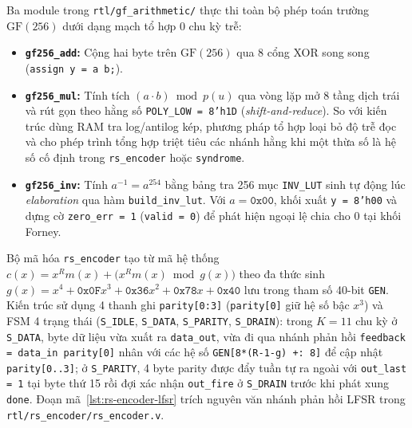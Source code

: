 \documentclass[11pt,a4paper]{report}
\begin{document}
Ba module trong \texttt{rtl/gf\_arithmetic/} thực thi toàn bộ phép toán trường $\text{GF}(256)$ dưới dạng mạch tổ hợp 0 chu kỳ trễ:
\begin{itemize}
    \item \textbf{\texttt{gf256\_add}:} Cộng hai byte trên $\text{GF}(256)$ qua 8 cổng XOR song song (\texttt{assign y = a  b;}).
    \item \textbf{\texttt{gf256\_mul}:} Tính tích $(a \cdot b) \bmod p(u)$ qua vòng lặp mở 8 tầng dịch trái và rút gọn theo hằng số \texttt{POLY\_LOW = 8'h1D} (\textit{shift-and-reduce}). So với kiến trúc dùng RAM tra log/antilog kép, phương pháp tổ hợp loại bỏ độ trễ đọc và cho phép trình tổng hợp triệt tiêu các nhánh hằng khi một thừa số là hệ số cố định trong \texttt{rs\_encoder} hoặc \texttt{syndrome}.
    \item \textbf{\texttt{gf256\_inv}:} Tính $a^{-1} = a^{254}$ bằng bảng tra 256 mục \texttt{INV\_LUT} sinh tự động lúc \textit{elaboration} qua hàm \texttt{build\_inv\_lut}. Với $a = \texttt{0x00}$, khối xuất \texttt{y = 8'h00} và dựng cờ \texttt{zero\_err = 1} (\texttt{valid = 0}) để phát hiện ngoại lệ chia cho 0 tại khối Forney.
\end{itemize}

Bộ mã hóa \texttt{rs\_encoder} tạo từ mã hệ thống $c(x) = x^R m(x) + \big(x^R m(x) \bmod g(x)\big)$ theo đa thức sinh $g(x) = x^4 + \texttt{0x0F}x^3 + \texttt{0x36}x^2 + \texttt{0x78}x + \texttt{0x40}$ lưu trong tham số 40-bit \texttt{GEN}. Kiến trúc sử dụng 4 thanh ghi \texttt{parity[0:3]} (\texttt{parity[0]} giữ hệ số bậc $x^3$) và FSM 4 trạng thái (\texttt{S\_IDLE}, \texttt{S\_DATA}, \texttt{S\_PARITY}, \texttt{S\_DRAIN}): trong $K=11$ chu kỳ ở \texttt{S\_DATA}, byte dữ liệu vừa xuất ra \texttt{data\_out}, vừa đi qua nhánh phản hồi \texttt{feedback = data\_in  parity[0]} nhân với các hệ số \texttt{GEN[8*(R-1-g) +: 8]} để cập nhật \texttt{parity[0..3]}; ở \texttt{S\_PARITY}, 4 byte parity được đẩy tuần tự ra ngoài với \texttt{out\_last = 1} tại byte thứ 15 rồi đợi xác nhận \texttt{out\_fire} ở \texttt{S\_DRAIN} trước khi phát xung \texttt{done}. Đoạn mã~\ref{lst:rs-encoder-lfsr} trích nguyên văn nhánh phản hồi LFSR trong \texttt{rtl/rs\_encoder/rs\_encoder.v}.
\end{document}
